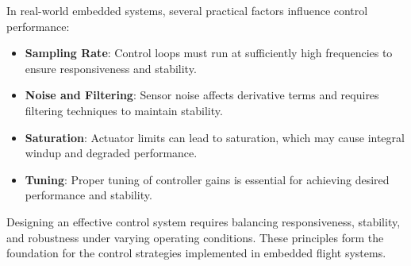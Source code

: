 In real-world embedded systems, several practical factors influence control performance:

\begin{itemize}
    \item \textbf{Sampling Rate}:  
    Control loops must run at sufficiently high frequencies to ensure responsiveness and stability.

    \item \textbf{Noise and Filtering}:  
    Sensor noise affects derivative terms and requires filtering techniques to maintain stability.

    \item \textbf{Saturation}:  
    Actuator limits can lead to saturation, which may cause integral windup and degraded performance.

    \item \textbf{Tuning}:  
    Proper tuning of controller gains is essential for achieving desired performance and stability.
\end{itemize}

Designing an effective control system requires balancing responsiveness, stability, and robustness under varying operating conditions. These principles form the foundation for the control strategies implemented in embedded flight systems.